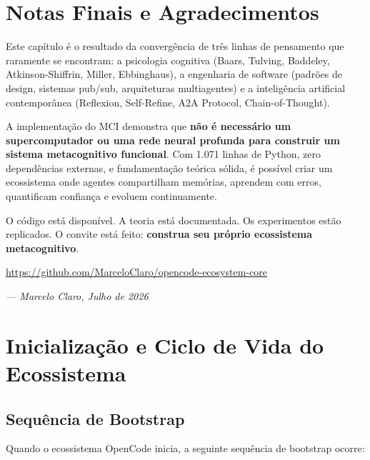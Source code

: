 \section{Notas Finais e Agradecimentos}
\label{sec:acknowledgments}

Este capítulo é o resultado da convergência de três linhas de pensamento que raramente se encontram: a psicologia cognitiva (Baars, Tulving, Baddeley, Atkinson-Shiffrin, Miller, Ebbinghaus), a engenharia de software (padrões de design, sistemas pub/sub, arquiteturas multiagentes) e a inteligência artificial contemporânea (Reflexion, Self-Refine, A2A Protocol, Chain-of-Thought).

A implementação do MCI demonstra que \textbf{não é necessário um supercomputador ou uma rede neural profunda para construir um sistema metacognitivo funcional}. Com 1.071 linhas de Python, zero dependências externas, e fundamentação teórica sólida, é possível criar um ecossistema onde agentes compartilham memórias, aprendem com erros, quantificam confiança e evoluem continuamente.

O código está disponível. A teoria está documentada. Os experimentos estão replicados. O convite está feito: \textbf{construa seu próprio ecossistema metacognitivo}.

\begin{center}
\url{https://github.com/MarceloClaro/opencode-ecosystem-core}
\end{center}

\begin{flushright}
\textit{--- Marcelo Claro, Julho de 2026}
\end{flushright}

\section{Inicialização e Ciclo de Vida do Ecossistema}
\label{sec:lifecycle}

\subsection{Sequência de Bootstrap}

Quando o ecossistema OpenCode inicia, a seguinte sequência de bootstrap ocorre:


